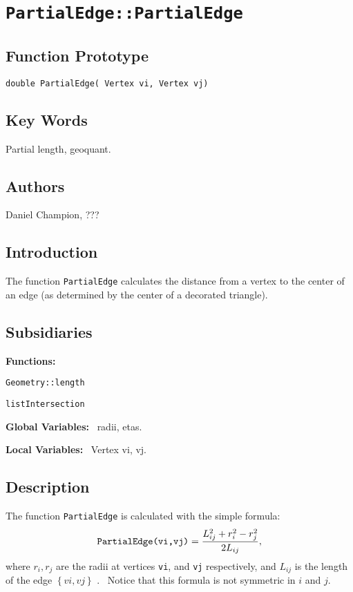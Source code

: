                       

\section*{\texttt{PartialEdge::PartialEdge}}

\subsection*{Function Prototype}

\texttt{double PartialEdge( Vertex vi, Vertex vj)}

\subsection*{Key Words}

Partial length, geoquant.

\subsection*{Authors}

Daniel Champion, ???

\subsection*{Introduction}

The function \texttt{PartialEdge} calculates the distance from a vertex to
the center of an edge (as determined by the center of a decorated triangle).

\subsection*{Subsidiaries}

\textbf{Functions:}

\qquad\texttt{Geometry::length}

\qquad\texttt{listIntersection}

\textbf{Global Variables:} \ radii, etas.

\textbf{Local Variables:} \ Vertex vi, vj.

\subsection*{Description}

The function \texttt{PartialEdge} is calculated with the simple formula:%
\begin{equation*}
\mathtt{PartialEdge}\text{\texttt{(vi,vj)}}=\frac{%
L_{ij}^{2}+r_{i}^{2}-r_{j}^{2}}{2L_{ij}},
\end{equation*}%
where $r_{i},r_{j}$ are the radii at vertices \texttt{vi}, and \texttt{vj}
respectively, and $L_{ij}$ is the length of the edge $\left\{ vi,vj\right\} $%
. \ Notice that this formula is not symmetric in $i$ and $j$. \ 

